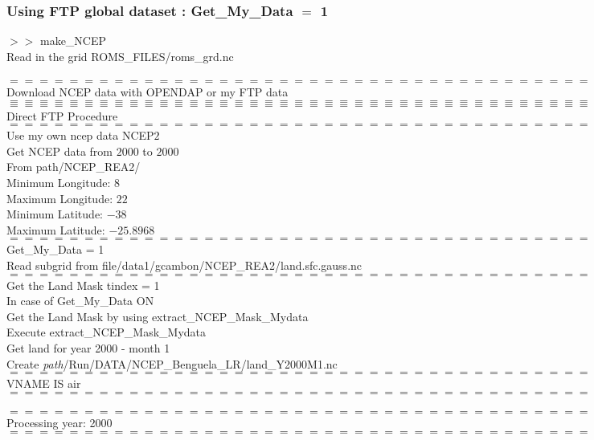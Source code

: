 \subsubsection{Using FTP global dataset : Get\_My\_Data $=$ 1}
$>>$ make\_NCEP \\
Read in the grid ROMS\_FILES/roms\_grd.nc \\
\\ 
$============================================$ \\
Download NCEP data with OPENDAP or my FTP data \\
$============================================$ \\
$============================================$ \\
Direct FTP Procedure \\
$============================================$ \\
Use my own ncep data NCEP$2$ \\ 
 
\noindent Get NCEP data from $2000$ to $2000$ \\
From path/NCEP\_REA2/  \\
 
\noindent Minimum Longitude: $8$ \\
Maximum Longitude: $22$ \\
Minimum Latitude: $-38$ \\
Maximum Latitude: $-25.8968$ \\

\noindent $============================================$ \\
Get\_My\_Data = 1 \\
Read subgrid from file/data1/gcambon/NCEP\_REA2/land.sfc.gauss.nc \\
$============================================$ \\
\noindent Get the Land Mask tindex = 1 \\
\noindent In case of Get\_My\_Data ON \\

\noindent Get the Land Mask by using extract\_NCEP\_Mask\_Mydata \\
\noindent Execute extract\_NCEP\_Mask\_Mydata \\
 
 
\noindent Get land for year 2000 - month 1 \\

\noindent Create \textit{path}/Run/DATA/NCEP\_Benguela\_LR/land\_Y2000M1.nc \\
$============================================$ \\
VNAME IS air \\
$============================================$ \\
\\
$============================================$ \\
Processing year: 2000 \\
$============================================$ \\





